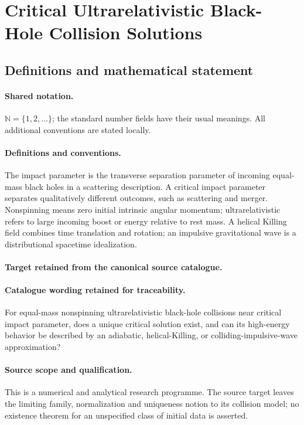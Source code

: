 \documentclass[11pt]{article}
\begin{document}
\section{Critical Ultrarelativistic Black-Hole Collision Solutions}\label{statement}

\subsection{Definitions and mathematical statement}

\paragraph{Shared notation.}$\mathbb N=\{1,2,\ldots\}$; the standard number fields have their usual meanings. All additional conventions are stated locally.


\paragraph{Definitions and conventions.}
The impact parameter is the transverse separation parameter of incoming equal-mass black holes in a scattering description. A critical impact parameter separates qualitatively different outcomes, such as scattering and merger. Nonspinning means zero initial intrinsic angular momentum; ultrarelativistic refers to large incoming boost or energy relative to rest mass. A helical Killing field combines time translation and rotation; an impulsive gravitational wave is a distributional spacetime idealization.

\paragraph{Target retained from the canonical source catalogue.}
\paragraph{Catalogue wording retained for traceability.}
For equal-mass nonspinning ultrarelativistic black-hole collisions near critical impact parameter, does a unique critical solution exist, and can its high-energy behavior be described by an adiabatic, helical-Killing, or colliding-impulsive-wave approximation?

\paragraph{Source scope and qualification.}
This is a numerical and analytical research programme. The source target leaves the limiting family, normalization and uniqueness notion to its collision model; no existence theorem for an unspecified class of initial data is asserted.
\end{document}
